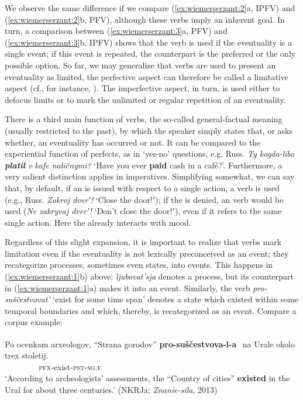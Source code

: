 \documentclass[output=paper]{langsci/langscibook}
\begin{document}
We observe the same difference if we compare (\ref{ex:wiemerserzant:2}a, IPFV) and (\ref{ex:wiemerserzant:2}b, PFV), although these verbs imply an inherent goal. In turn, a comparison between (\ref{ex:wiemerserzant:3}a, PFV) and (\ref{ex:wiemerserzant:3}b, IPFV) shows that the  verb is used if the eventuality is a single event; if this event is repeated, the  counterpart is the preferred or the only possible option. So far, we may generalize that  verbs are used to present an eventuality as limited, the  perfective aspect can therefore be called a limitative aspect (cf., for instance, \citealt[38]{Breu2000a}). The imperfective aspect, in turn, is used either to defocus limits or to mark the unlimited or regular repetition of an eventuality.

There is a third main function of  verbs, the so-called general-factual meaning (usually restricted to the past), by which the speaker simply states that, or asks whether, an eventuality has occurred or not. It can be compared to the experiential function of perfects, as in ‘yes-no’ questions, e.g. Russ. \textit{Ty kogda-libo} \textbf{\textit{platil}}{\IPFV} \textit{v kafe naličnymi?} ‘Have you ever \textbf{paid} cash in a café?’. Furthermore, a very salient distinction applies in imperatives. Simplifying somewhat, we can say that, by default, if an  is issued with respect to a single action, a  verb is used (e.g., Russ. \textit{Zakroj dverʼ!} ‘Close the door!ʼ); if the  is denied, an  verb would be used (\textit{Ne zakryvaj dverʼ!} ‘Don’t close the door!ʼ), even if it refers to the same single action. Here the  already interacts with mood.

Regardless of this slight expansion, it is important to realize that  verbs mark limitation even if the eventuality is not lexically preconceived as an event; they recategorize processes, sometimes even states, into events. This happens in (\ref{ex:wiemerserzant:1}b) above: \textit{ljubovat’sja} denotes a process, but its  counterpart in (\ref{ex:wiemerserzant:1}a) makes it into an event. Similarly, the  verb \textit{pro-suščestvovat’} ‘exist for some time span’ denotes a state which existed within some temporal boundaries and which, thereby, is recategorized as an event. Compare a corpus example:\newpage

\ea
    \label{ex:wiemerserzant:4} 
    \gll   Po ocenkam arxeologov, “Strana gorodov” \textbf{pro-suščestvova-l-a}{\textsuperscript{~}\PFV}  na Urale okolo trex stoletij.\\
           ~   ~       ~          ~        ~    \textsc{pfx}-exist-\textsc{pst-sg.f}\\
    \glt ‘According to archeologists’ assessments, the “Country of cities” \textbf{existed} in the Ural for about three centuries.’ (NKRJa; \textit{Znanie-sila}, 2013)
\z
\end{document}
